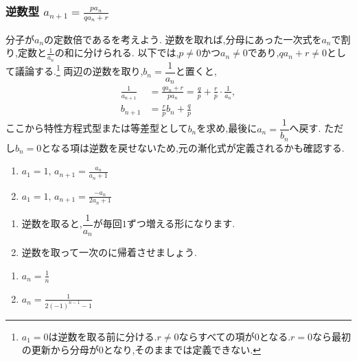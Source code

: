 
\subsubsection{\texorpdfstring{逆数型   $\displaystyle a_{n+1}=\frac{pa_n}{qa_n+r}$}{逆数型}}\label{節：逆数型}
分子が$a_n$の定数倍であるを考えよう.
逆数を取れば,分母にあった一次式を$a_n$で割り,定数と$\frac1{a_n}$の和に分けられる.
以下では,$p\ne0$かつ$a_n\ne0$であり,$qa_n+r\ne0$として議論する.\footnote{$a_1=0$は逆数を取る前に分ける.$r\ne0$ならすべての項が$0$となる.$r=0$なら最初の更新から分母が$0$となり,そのままでは定義できない.}
両辺の逆数を取り,$b_n=\dfrac{1}{a_n}$と置くと,
\begin{align*}
  \frac{1}{a_{n+1}}&=\frac{qa_n+r}{pa_n}
  =\frac{q}{p}+\frac{r}{p}\cdot\frac{1}{a_n},\\
  b_{n+1}&=\frac{r}{p}b_n+\frac{q}{p}
\end{align*}
ここから特性方程式型または等差型として$b_n$を求め,最後に$a_n=\dfrac{1}{b_n}$へ戻す.
ただし$b_n=0$となる項は逆数を戻せないため,元の漸化式が定義されるかも確認する.

\noindent {}\par\nobreak
\begin{enumerate}[label=(\arabic*),parsep=3pt,format=\bookitemlink{example-reciprocal-1}{problem}{answer}]
  \item $\displaystyle a_1=1,\, a_{n+1}=\frac{a_n}{a_n+1}$
  \item $\displaystyle a_1=1,\, a_{n+1}=\frac{-a_n}{2a_n+1}$
\end{enumerate}

\noindent{}\par\nobreak
\begin{enumerate}[label=(\arabic*),parsep=3pt,format=\bookitemlink{example-reciprocal-1}{hint}{problem}]
  \item 逆数を取ると,$\dfrac{1}{a_n}$が毎回$1$ずつ増える形になります.
  \item 逆数を取って一次のに帰着させましょう.
\end{enumerate}

\noindent{}\par\nobreak
\begin{enumerate}[label=(\arabic*),parsep=3pt,format=\bookitemlink{example-reciprocal-1}{answer}{problem}]
  \item $\displaystyle a_n=\frac{1}{n}$
  \item $\displaystyle a_n=\frac{1}{2(-1)^{n-1}-1}$
\end{enumerate}

